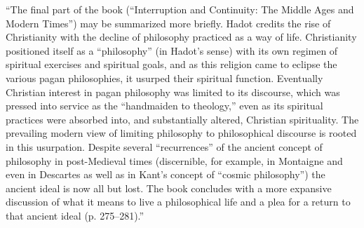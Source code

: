 \begin{footnotesize}
\begin{sffamily}
``The final part of the book (``Interruption and Continuity: The Middle Ages and Modern Times'') may be summarized more briefly. Hadot credits the rise of Christianity with the decline of philosophy practiced as a way of life. Christianity positioned itself as a ``philosophy'' (in Hadot's sense) with its own regimen of spiritual exercises and spiritual goals, and as this religion came to eclipse the various pagan philosophies, it usurped their spiritual function. Eventually Christian interest in pagan philosophy was limited to its discourse, which was pressed into service as the ``handmaiden to theology,'' even as its spiritual practices were absorbed into, and substantially altered, Christian spirituality. The prevailing modern view of limiting philosophy to philosophical discourse is rooted in this usurpation. Despite several ``recurrences'' of the ancient concept of philosophy in post-Medieval times (discernible, for example, in Montaigne and even in Descartes as well as in Kant's concept of ``cosmic philosophy'') the ancient ideal is now all but lost. The book concludes with a more expansive discussion of what it means to live a philosophical life and a plea for a return to that ancient ideal (p. 275--281).''


\hfill

\end{sffamily}
\end{footnotesize}

